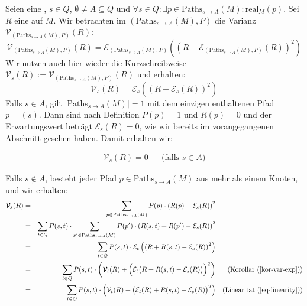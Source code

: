 \documentclass[a4paper]{article}
\theoremstyle{nonumberplain}
\begin{document}
Seien \mcex{} eine \mc{}, $s \in Q$, $\emptyset \neq A \subseteq Q$ und $\forall s \in Q: \exists p \in \mathrm{Paths}_{s \rightarrow A}(M) : \mathrm{real}_{M}(p)$. Sei $R$ eine  \reward{} auf $M$. Wir betrachten im \probspace{} $(\mathrm{Paths}_{s \rightarrow A}(M), P)$ die Varianz $\mathcal{V}_{(\mathrm{Paths}_{s \rightarrow A}(M), P)}(R)$:
\begin{equation}
	\mathcal{V}_{(\mathrm{Paths}_{s \rightarrow A}(M), P)}(R) = \mathcal{E}_{(\mathrm{Paths}_{s \rightarrow A}(M), P)}\left(\left(R - \mathcal{E}_{(\mathrm{Paths}_{s \rightarrow A}(M), P)} (R)\right)^{2}\right) 
\end{equation}
Wir nutzen auch hier wieder die Kurzschreibweise $\mathcal{V}_{s}(R) := \mathcal{V}_{(\mathrm{Paths}_{s \rightarrow A}(M), P)}(R)$ und erhalten:
\begin{equation}
\mathcal{V}_{s}(R) = \mathcal{E}_{s}\left(\left(R - \mathcal{E}_{s} (R)\right)^{2}\right)
\end{equation}
Falls $s \in A$, gilt $|\mathrm{Paths}_{s \rightarrow A}(M)| = 1$ mit dem einzigen enthaltenen Pfad $p = (s)$. Dann sind nach Definition $P(p) = 1$ und $R(p) = 0$ und der Erwartungswert beträgt $\mathcal{E}_{s}(R) = 0$, wie wir bereits im vorangegangenen Abschnitt gesehen haben. Damit erhalten wir:

\begin{align}
\mathcal{V}_{s}(R) = 0 && \text{(falls $s \in A$)}\label{var_trivial}
\end{align}

Falls $s \notin A$, besteht jeder Pfad $p \in \mathrm{Paths}_{s \rightarrow A}(M)$ aus mehr als einem Knoten, und wir erhalten:
\begin{align}
\mathcal{V}_{s}(R) & = & \sum_{p \in \mathrm{Paths}_{s \rightarrow A}(M)}{P(p) \cdot \left(R(p) - \mathcal{E}_{s}(R)\right)^2} \\
& = & \sum_{t \in Q}{ P(s,t) \cdot \sum_{p' \in \mathrm{Paths}_{t \rightarrow A}(M)}{ P(p') \cdot \left(R(s,t) + R(p') - \mathcal{E}_{s}(R)\right)^2 } } \\
& = & \sum_{t \in Q}{ P(s,t) \cdot \mathcal{E}_{t}\left(\left(R + R(s,t) - \mathcal{E}_{s}(R)\right)^2\right) } \\
& = & \sum_{t \in Q}{ P(s,t) \cdot \bigg(\mathcal{V}_{t}(R) + \Big(\mathcal{E}_{t}\big(R + R(s,t) - \mathcal{E}_{s}(R)\big)\Big)^2\bigg) } && \text{(Korollar (\ref{kor-var-exp}))}\\
& = & \sum_{t \in Q}{ P(s,t) \cdot \Big(\mathcal{V}_{t}(R) + \big(\mathcal{E}_{t}(R) + R(s,t) - \mathcal{E}_{s}(R)\big)^2\Big) } && \text{(Linearität (\ref{eq-linearity}))} \label{var_recursive}
\end{align}
\end{document}
